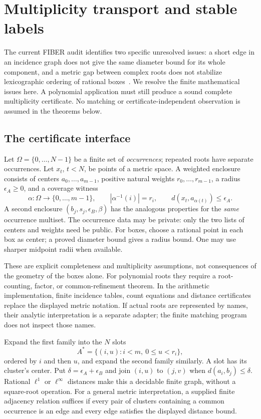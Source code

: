\section{Multiplicity transport and stable labels}
\label{sec:cluster-transport}

The current FIBER audit identifies two specific unresolved issues: a short
edge in an incidence graph does not give the same diameter bound for its
whole component, and a metric gap between complex roots does not stabilize
lexicographic ordering of rational boxes~\cite{repo-fiber}.  We resolve the
finite mathematical issues here.  A polynomial application must still
produce a sound complete multiplicity certificate.  No matching or
certificate-independent observation is assumed in the theorems below.

\subsection{The certificate interface}

Let $\Omega=\{0,\ldots,N-1\}$ be a finite set of \emph{occurrences}; repeated
roots have separate occurrences.  Let $x_t$, $t<N$, be points of a metric
space.  A weighted enclosure consists of centers $a_0,\ldots,a_{m-1}$,
positive natural weights $r_0,\ldots,r_{m-1}$, a radius $\epsilon_A\geq0$,
and a coverage witness
\[
 \alpha:\Omega\longrightarrow\{0,\ldots,m-1\},\qquad
 |\alpha^{-1}(i)|=r_i,\qquad d(x_t,a_{\alpha(t)})\leq\epsilon_A.
 \tag{C-A}
\]
A second enclosure $(b_j,s_j,\epsilon_B,\beta)$ has the analogous properties
for the \emph{same} occurrence multiset.  The occurrence data may be private:
only the two lists of centers and weights need be public.  For boxes, choose
a rational point in each box as center; a proved diameter bound gives a
radius bound.  One may use sharper midpoint radii when available.

These are explicit completeness and multiplicity assumptions, not consequences
of the geometry of the boxes alone.  For polynomial roots they require a
root-counting, factor, or common-refinement theorem.  In the arithmetic
implementation, finite incidence tables, count equations and distance
certificates replace the displayed metric notation.  If actual roots are
represented by names, their analytic interpretation is a separate adapter;
the finite matching program does not inspect those names.

Expand the first family into the $N$ slots
\[
       A^*=\{(i,u):i<m,\ 0\leq u<r_i\},
\]
ordered by $i$ and then $u$, and expand the second family similarly.  A slot
has its cluster's center.  Put $\delta=\epsilon_A+\epsilon_B$ and join
$(i,u)$ to $(j,v)$ when $d(a_i,b_j)\leq\delta$.  Rational $\ell^1$ or
$\ell^\infty$ distances make this a decidable finite graph, without a
square-root operation.  For a general metric interpretation, a supplied
finite adjacency relation suffices if every pair of clusters containing a
common occurrence is an edge and every edge satisfies the displayed
distance bound.

